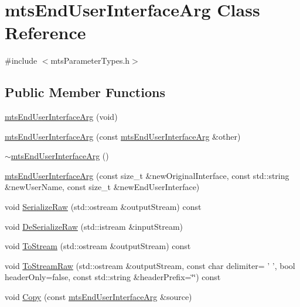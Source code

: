 \hypertarget{classmts_end_user_interface_arg}{\section{mts\-End\-User\-Interface\-Arg Class Reference}
\label{classmts_end_user_interface_arg}
}


{\ttfamily \#include $<$mts\-Parameter\-Types.\-h$>$}

\subsection*{Public Member Functions}
\begin{DoxyCompactItemize}
\item 
\hyperlink{classmts_end_user_interface_arg_a8daa91521e9ae9aba41ff0a86eb8be32}{mts\-End\-User\-Interface\-Arg} (void)
\item 
\hyperlink{classmts_end_user_interface_arg_a3a8b4d5845b6b51793023f7141bd3ed9}{mts\-End\-User\-Interface\-Arg} (const \hyperlink{classmts_end_user_interface_arg}{mts\-End\-User\-Interface\-Arg} \&other)
\item 
\hyperlink{classmts_end_user_interface_arg_a18c314acc29c24c78f0b30b735812ac7}{$\sim$mts\-End\-User\-Interface\-Arg} ()
\item 
\hyperlink{classmts_end_user_interface_arg_a30628f4ff388e96bdb90da79894c94ab}{mts\-End\-User\-Interface\-Arg} (const size\-\_\-t \&new\-Original\-Interface, const std\-::string \&new\-User\-Name, const size\-\_\-t \&new\-End\-User\-Interface)
\item 
void \hyperlink{classmts_end_user_interface_arg_a4083d87feeb0463ff41500e2676d97ca}{Serialize\-Raw} (std\-::ostream \&output\-Stream) const 
\item 
void \hyperlink{classmts_end_user_interface_arg_ac46680a73fa9ad45491e281e159e5953}{De\-Serialize\-Raw} (std\-::istream \&input\-Stream)
\item 
void \hyperlink{classmts_end_user_interface_arg_af2dccb111ad6addf14e367a3e6fe1cf6}{To\-Stream} (std\-::ostream \&output\-Stream) const 
\item 
void \hyperlink{classmts_end_user_interface_arg_aedb07f8b29a24417ff3d648600838eb5}{To\-Stream\-Raw} (std\-::ostream \&output\-Stream, const char delimiter= ' ', bool header\-Only=false, const std\-::string \&header\-Prefix=\char`\"{}\char`\"{}) const 
\item 
void \hyperlink{classmts_end_user_interface_arg_a8689f6f55e431f3b28dd67d44bf0d238}{Copy} (const \hyperlink{classmts_end_user_interface_arg}{mts\-End\-User\-Interface\-Arg} \&source)

\end{DoxyCompactItemize}
